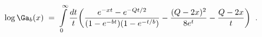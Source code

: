 \begin{equation}
\log\Ga_b(x)\;=\;\int\limits_0^{\infty}\frac{dt}{t}
\biggl(\frac{e^{-xt}-e^{-Qt/2}}{(1-e^{-bt})(1-e^{-t/b})}-
\frac{(Q-2x)^2}{8e^t}-\frac{Q-2x}{t}\biggl)\;\;.
\end{equation}

